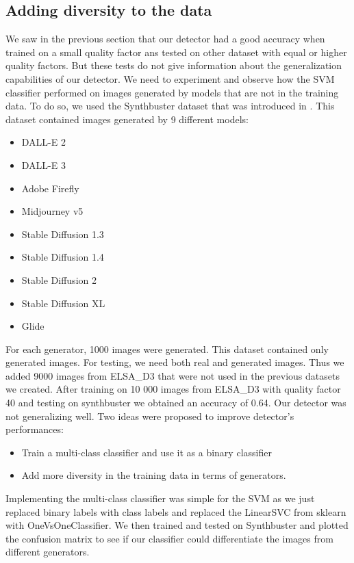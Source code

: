 \documentclass[12pt,a4paper]{article}
\begin{document}
\subsection{Adding diversity to the data}
We saw in the previous section that our detector had a good accuracy when trained on a small quality factor ans tested on other dataset with equal or higher quality factors. But these tests do not give information about the generalization capabilities of our detector. We need to experiment and observe how the SVM classifier performed on images generated by models that are not in the training data. To do so, we used the Synthbuster dataset that was introduced in \autocite{bammeySynthbusterDetectionDiffusion2024}. This dataset contained images generated by 9 different models:
\begin{itemize}
    \item DALL-E 2
    \item DALL-E 3
    \item Adobe Firefly
    \item Midjourney v5
    \item Stable Diffusion 1.3
    \item Stable Diffusion 1.4
    \item Stable Diffusion 2
    \item Stable Diffusion XL
    \item Glide
\end{itemize}

For each generator, 1000 images were generated. This dataset contained only generated images. For testing, we need both real and generated images. Thus we added 9000 images from ELSA\_D3 that were not used in the previous datasets we created.
After training on 10 000 images from ELSA\_D3 with quality factor 40 and testing on synthbuster we obtained an accuracy of 0.64. Our detector was not generalizing well. Two ideas were proposed to improve detector's performances:
\begin{itemize}
    \item Train a multi-class classifier and use it as a binary classifier
    \item Add more diversity in the training data in terms of generators.
\end{itemize}

Implementing the multi-class classifier was simple for the SVM as we just replaced binary labels with class labels and replaced the LinearSVC from sklearn with OneVsOneClassifier. We then trained and tested on Synthbuster and plotted the confusion matrix to see if our classifier could differentiate the images from different generators.
\end{document}
